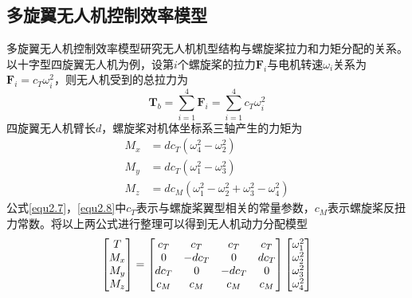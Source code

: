 \subsection{多旋翼无人机控制效率模型}
多旋翼无人机控制效率模型研究无人机机型结构与螺旋桨拉力和力矩分配的关系\upcite{[2.4]}。以十字型四旋翼无人机为例，设第$i$个螺旋桨的拉力$\boldsymbol{F}_i$与电机转速$\omega_i$关系为$\boldsymbol{F}_i = c_T \omega_i^2$，则无人机受到的总拉力为
\begin{equation}
\label{equ2.7}
\boldsymbol{T}_b = \sum\limits_{i=1}^4 \boldsymbol{F}_i =  \sum\limits_{i=1}^4 c_T \omega_i^2
\end{equation}
四旋翼无人机臂长$d$，螺旋桨对机体坐标系三轴产生的力矩为
\begin{equation}
\label{equ2.8}
\begin{aligned}
M_x &= d c_T \left( \omega_4^2 - \omega_2^2\right)
\\
M_y &= d c_T \left( \omega_1^2 - \omega_3^2\right)
\\
M_z &= d c_M \left( \omega_1^2 - \omega_2^2 + \omega_3^2 - \omega_4^2\right)
\end{aligned}
\end{equation}
公式\eqref{equ2.7}，\eqref{equ2.8}中$c_T $表示与螺旋桨翼型相关的常量参数，$c_M$表示螺旋桨反扭力常数。将以上两公式进行整理可以得到无人机动力分配模型
\begin{equation}
\label{equ2.9}
\begin{bmatrix}
T \cr M_x \cr M_y \cr M_z \cr 
\end{bmatrix}
=
\begin{bmatrix}
c_T & c_T & c_T & c_T  \cr
0 & -d c_T & 0 & d c_T \cr
d c_T & 0 & -d c_T & 0 \cr
c_M & c_M & c_M & c_M  \cr
\end{bmatrix}
\begin{bmatrix}
\omega_1^2 \cr \omega_2^2 \cr \omega_3^2 \cr \omega_4^2 \cr
\end{bmatrix}
\end{equation}


